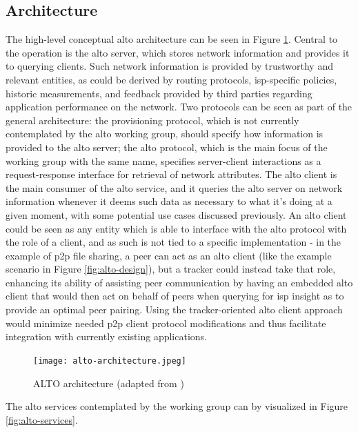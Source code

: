 \subsection{Architecture}

    The high-level conceptual \gls{alto} architecture can be seen in Figure \ref{fig:alto-architecture}.
        Central to the operation is the \gls{alto} server, which stores network information and provides it to querying clients.
        Such network information is provided by trustworthy and relevant entities, as could be derived by routing protocols, \gls{isp}-specific policies, historic measurements, and feedback provided by third parties regarding application performance on the network.
        Two protocols can be seen as part of the general architecture: the provisioning protocol, which is not currently contemplated by the \gls{alto} working group, should specify how information is provided to the \gls{alto} server; the \gls{alto} protocol, which is the main focus of the working group with the same name, specifies server-client interactions as a request-response interface for retrieval of network attributes.
        The \gls{alto} client is the main consumer of the \gls{alto} service, and it queries the \gls{alto} server on network information whenever it deems such data as necessary to what it's doing at a given moment, with some potential use cases discussed previously.
        An \gls{alto} client could be seen as any entity which is able to interface with the \gls{alto} protocol with the role of a client, and as such is not tied to a specific implementation - in the example of \gls{p2p} file sharing, a peer can act as an \gls{alto} client (like the example scenario in Figure \ref{fig:alto-design}), but a tracker could instead take that role, enhancing its ability of assisting peer communication by having an embedded \gls{alto} client that would then act on behalf of peers when querying for \gls{isp} insight as to provide an optimal peer pairing.
        Using the tracker-oriented \gls{alto} client approach would minimize needed \gls{p2p} client protocol modifications and thus facilitate integration with currently existing applications.

    \begin{figure}[H]
    \centering
    \texttt{[image: alto-architecture.jpeg]}
    \caption{ALTO architecture (adapted from \cite{alto-protocol})}
    \label{fig:alto-architecture}
    \end{figure}

    The \gls{alto} services contemplated by the working group can by visualized in Figure \ref{fig:alto-services}.

